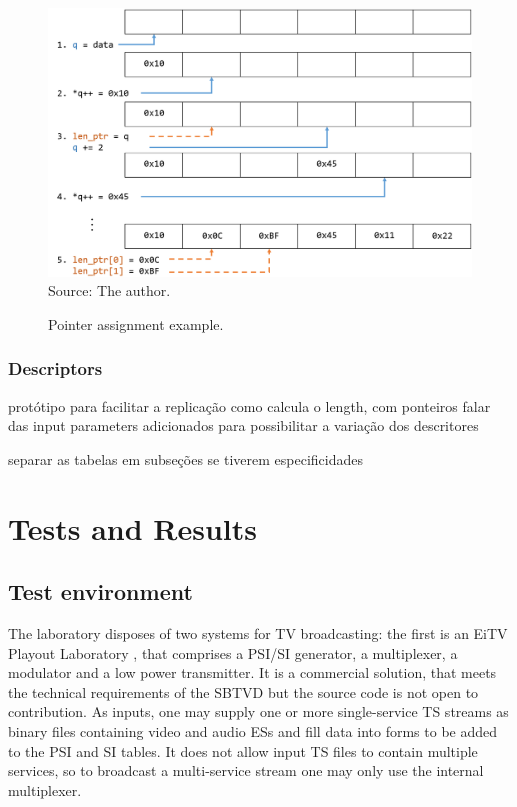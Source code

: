 \documentclass[
	12pt,				%
	openright,			%
	twoside,			%
	a4paper,			%
	brazil,
	french,				%
	english
	]{abntex2}
\begin{document}
\begin{figure}[!h]
\centering
\caption{Pointer assignment example.}
\includegraphics[width=1\linewidth]{figuras/pointer_assignment.png}
\\Source: The author.
\label{fig:pointer_assignment}
\end{figure}

\subsection{Descriptors}
protótipo para facilitar a replicação
como calcula o length, com ponteiros
falar das input parameters adicionados para possibilitar a variação dos descritores

separar as tabelas em subseções se tiverem especificidades


\chapter{Tests and Results}
%
\section{Test environment}

The laboratory disposes of two systems for TV broadcasting: the first is an EiTV Playout Laboratory \cite{eitv}, that comprises a PSI/SI generator, a multiplexer, a modulator and a low power transmitter. It is a commercial solution, that meets the technical requirements of the SBTVD but the source code is not open to contribution. As inputs, one may supply one or more single-service TS streams as binary files containing video and audio ESs and fill data into forms to be added to the PSI and SI tables. It does not allow input TS files to contain multiple services, so to broadcast a multi-service stream one may only use the internal multiplexer.
\end{document}
